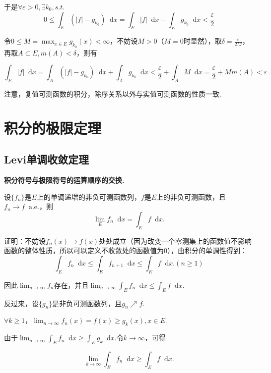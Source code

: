 \documentclass[bwprint, withoutpreface]{cumcmthesis}
\newcommand*{\dif}{\mathop{}\!\mathrm{d}}
\begin{document}
于是$\forall \varepsilon > 0, \exists k_0, s.t.$ \[ 0 \leqslant \int_E (|f| - g_{k_0}) \dif x = \int_E |f| \dif x - \int_E g_{k_0} \dif x < \frac{\varepsilon}{2} \]

令$0 \leqslant M = \max_{x \in E}{g_{k_0}(x)} < \infty$，不妨设$M > 0$（$M = 0$时显然），取$\delta = \frac{\varepsilon}{2M}$，再取$A \subset E, m(A) < \delta$，则有

\begin{equation*}
	\int_E |f| \dif x = \int_A (|f| - g_{k_0}) \dif x + \int_A g_{k_0} \dif x < \frac{\varepsilon}{2} + \int_A M \dif x = \frac{\varepsilon}{2} + Mm(A) < \varepsilon
\end{equation*}

注意，复值可测函数的积分，除序关系以外与实值可测函数的性质一致.

\section{积分的极限定理}
\subsection{Levi单调收敛定理}

\textbf{积分符号与极限符号的运算顺序的交换.}

设$\{f_n\}$是$E$上的单调递增的非负可测函数列，$f$是$E$上的非负可测函数，且$f_n \to f \mathop{} \! \mathrm{a.e.}$，则
\begin{equation*}
	\lim_E f_n \dif x = \int_E f \dif x.
\end{equation*}

证明：不妨设$f_n(x) \to f(x)$处处成立（因为改变一个零测集上的函数值不影响函数的整体性质，所以可以定义不收敛处的函数值为0），由积分的单调性得到：
\begin{equation*}
	\int_E f_n \dif x \leqslant \int_E f_{n + 1} \dif x \leqslant \int_E f \dif x. (n \geqslant 1)
\end{equation*}

因此$\lim_{n \to \infty}{f_n}$存在，并且$\lim_{n \to \infty}{\int_E f_n \dif x} \leqslant \int_E f \dif x.$

反过来，设$\{g_n\}$是非负可测函数列，且$g_n \nearrow f$.

$\forall k \geqslant 1$，$\lim_{n \to \infty}{f_n(x)} = f(x) \geqslant g_k(x), x \in E$.

由于$\lim_{n \to \infty}{\int_E f_n \dif x \geqslant \int_E g_k \dif x}$.令$k \to \infty$，可得

\begin{equation*}
	\lim_{k \to \infty}{\int_E f_n \dif x} \geqslant \int_E f \dif x.
\end{equation*}
\end{document}
